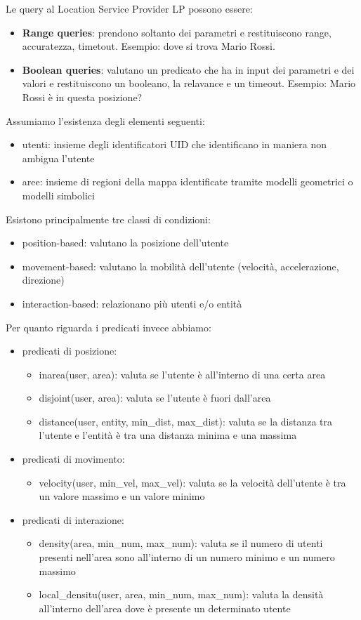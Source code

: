 Le query al Location Service Provider LP possono essere:
\begin{itemize}
    \item \textbf{Range queries}: prendono soltanto dei parametri e restituiscono range, accuratezza, timetout. Esempio: dove si trova Mario Rossi.
    \item \textbf{Boolean queries}: valutano un predicato che ha in input dei parametri e dei valori e restituiscono un booleano, la relavance e un timeout. Esempio: Mario Rossi è in questa posizione?
\end{itemize}
Assumiamo l'esistenza degli elementi seguenti:
\begin{itemize}
    \item utenti: insieme degli identificatori UID che identificano in maniera non ambigua l'utente
    \item aree: insieme di regioni della mappa identificate tramite modelli geometrici o modelli simbolici
\end{itemize}
Esistono principalmente tre classi di condizioni:
\begin{itemize}
    \item position-based: valutano la posizione dell'utente
    \item movement-based: valutano la mobilità dell'utente (velocità, accelerazione, direzione)
    \item interaction-based: relazionano più utenti e/o entità
\end{itemize}
Per quanto riguarda i predicati invece abbiamo:
\begin{itemize}
    \item predicati di posizione:
    \begin{itemize}
        \item inarea(user, area): valuta se l'utente è all'interno di una certa area
        \item disjoint(user, area): valuta se l'utente è fuori dall'area
        \item distance(user, entity, min\_dist, max\_dist): valuta se la distanza tra l'utente e l'entità è tra una distanza minima e una massima
    \end{itemize}
    
    \item predicati di movimento:
    \begin{itemize}
        \item velocity(user, min\_vel, max\_vel): valuta se la velocità dell'utente è tra un valore massimo e un valore minimo
    \end{itemize}
    \item predicati di interazione:
    \begin{itemize}
        \item density(area, min\_num, max\_num): valuta se il numero di utenti presenti nell'area sono all'interno di un numero minimo e un numero massimo
        \item local\_densitu(user, area, min\_num, max\_num): valuta la densità all'interno dell'area dove è presente un determinato utente
    \end{itemize}
\end{itemize}
